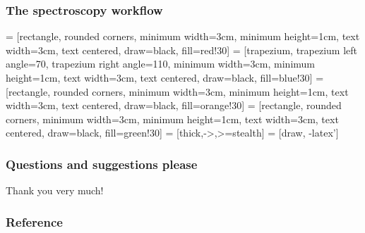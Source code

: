 \documentclass[10pt,dvipsnames,table]{beamer}
\begin{document}
\begin{frame}
\frametitle{The spectroscopy workflow}
 = [rectangle, rounded corners, minimum width=3cm, minimum height=1cm, text width=3cm, text centered, draw=black, fill=red!30]
 = [trapezium, trapezium left angle=70, trapezium right angle=110, minimum width=3cm, minimum height=1cm, text width=3cm, text centered, draw=black, fill=blue!30]
 = [rectangle, rounded corners, minimum width=3cm, minimum height=1cm, text width=3cm, text centered, draw=black, fill=orange!30]
 = [rectangle, rounded corners, minimum width=3cm, minimum height=1cm, text width=3cm, text centered, draw=black, fill=green!30]
 = [thick,->,>=stealth]
 = [draw, -latex']

\begin{figure}
\end{figure}
\end{frame}

\begin{frame}
\frametitle{Questions and suggestions please}

Thank you very much!

\end{frame}

\begin{frame}
\frametitle{Reference}
{\footnotesize{
    
    
}}
\end{frame}
\end{document}
